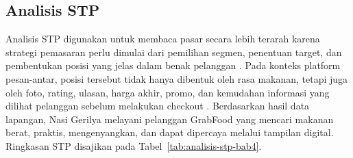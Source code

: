 \subsection{Analisis STP}
Analisis STP digunakan untuk membaca pasar secara lebih terarah karena strategi pemasaran perlu dimulai dari pemilihan segmen, penentuan target, dan pembentukan posisi yang jelas dalam benak pelanggan \parencite{kotler2023principlesmarketing,kotler2021marketingmanagement}. Pada konteks platform pesan-antar, posisi tersebut tidak hanya dibentuk oleh rasa makanan, tetapi juga oleh foto, rating, ulasan, harga akhir, promo, dan kemudahan informasi yang dilihat pelanggan sebelum melakukan checkout \parencite{chaffey2022digitalmarketing,sophia2025rendanggadih}. Berdasarkan hasil data lapangan, Nasi Gerilya melayani pelanggan GrabFood yang mencari makanan berat, praktis, mengenyangkan, dan dapat dipercaya melalui tampilan digital. Ringkasan STP disajikan pada Tabel~\ref{tab:analisis-stp-bab4}.

